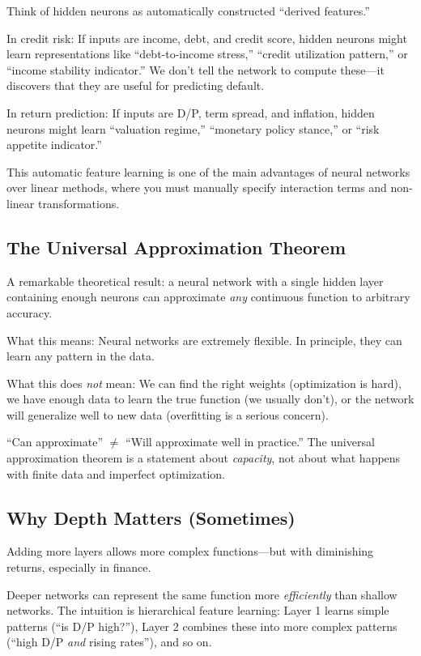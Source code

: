 \documentclass[11pt,a4paper]{article}
\begin{document}
Think of hidden neurons as automatically constructed ``derived features.''

In credit risk: If inputs are income, debt, and credit score, hidden neurons might learn representations like ``debt-to-income stress,'' ``credit utilization pattern,'' or ``income stability indicator.'' We don't tell the network to compute these---it discovers that they are useful for predicting default.

In return prediction: If inputs are D/P, term spread, and inflation, hidden neurons might learn ``valuation regime,'' ``monetary policy stance,'' or ``risk appetite indicator.''

This automatic feature learning is one of the main advantages of neural networks over linear methods, where you must manually specify interaction terms and non-linear transformations.

\subsection{The Universal Approximation Theorem}

A remarkable theoretical result: a neural network with a single hidden layer containing enough neurons can approximate \textit{any} continuous function to arbitrary accuracy.

What this means: Neural networks are extremely flexible. In principle, they can learn any pattern in the data.

What this does \textit{not} mean: We can find the right weights (optimization is hard), we have enough data to learn the true function (we usually don't), or the network will generalize well to new data (overfitting is a serious concern).

``Can approximate'' $\neq$ ``Will approximate well in practice.'' The universal approximation theorem is a statement about \textit{capacity}, not about what happens with finite data and imperfect optimization.

\subsection{Why Depth Matters (Sometimes)}

Adding more layers allows more complex functions---but with diminishing returns, especially in finance.

Deeper networks can represent the same function more \textit{efficiently} than shallow networks. The intuition is hierarchical feature learning: Layer 1 learns simple patterns (``is D/P high?''), Layer 2 combines these into more complex patterns (``high D/P \textit{and} rising rates''), and so on.
\end{document}
